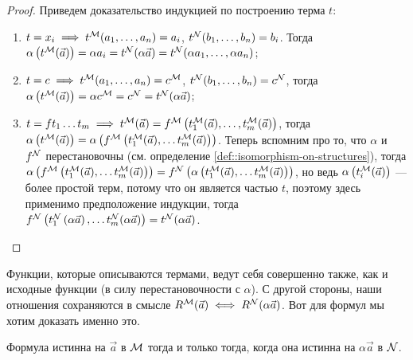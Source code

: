 \begin{proof}
    Приведем доказательство индукцией по построению терма $t$:
    \begin{enumerate}
        \item $t = x_{i} \implies t^{\mathcal{M}}(a_{1}, \ldots, a_{n}) = a_{i}$, $t^{\mathcal{N}}(b_{1}, \ldots, b_{n}) = b_{i}$.
        Тогда $\alpha\left(t^{\mathcal{M}}(\vec{a})\right) = \alpha a_{i} = t^{\mathcal{N}}(\alpha \vec{a}) = t^{\mathcal{N}}(\alpha a_{1}, \ldots, \alpha a_{n})$;
        \item $t = c \implies t^{\mathcal{M}}(a_{1}, \ldots, a_{n}) = c^{\mathcal{M}}$, $t^{\mathcal{N}}(b_{1}, \ldots, b_{n}) = c^{\mathcal{N}}$, тогда $\alpha\left(t^{\mathcal{M}}(\vec{a})\right) = \alpha c^{\mathcal{M}} = c^{\mathcal{N}} = t^{\mathcal{N}}(\alpha \vec{a})$;
        \item $t = f t_{1} \ldots t_{m} \implies t^{\mathcal{M}}(\vec{a}) = f^{\mathcal{M}}\left(t_{1}^{\mathcal{M}}(\vec{a}), \ldots, t_{m}^{\mathcal{M}}(\vec{a})\right)$, тогда $\alpha\left(t^{\mathcal{M}}(\vec{a})\right) = \alpha\left(f^{\mathcal{M}}\left(t_{1}^{\mathcal{M}}(\vec{a}), \ldots t_{m}^{\mathcal{M}}(\vec{a})\right)\right)$.
        Теперь вспомним про то, что $\alpha$ и $f^{\mathcal{N}}$ перестановочны (см. определение \ref{def::isomorphism-on-structures}), тогда $\alpha\left(f^{\mathcal{M}}\left(t_{1}^{\mathcal{M}}(\vec{a}), \ldots t_{m}^{\mathcal{M}}(\vec{a})\right)\right) = f^{\mathcal{N}}\left(\alpha\left(t_{1}^{\mathcal{M}}(\vec{a}), \ldots t_{m}^{\mathcal{M}}(\vec{a})\right)\right)$, но ведь $\alpha\left(t_{i}^{\mathcal{M}}(\vec{a})\right)$ --- более простой терм, потому что он является частью $t$, поэтому здесь применимо предположение индукции, тогда $f^{\mathcal{N}}\left(t_{1}^{\mathcal{N}}\left(\alpha\vec{a}\right), \ldots t_{m}^{\mathcal{N}}(\alpha\vec{a})\right) = t^{\mathcal{N}}(\alpha \vec{a})$. \qedhere
    \end{enumerate}
\end{proof}

Функции, которые описываются термами, ведут себя совершенно также, как и исходные функции (в силу перестановочности с $\alpha$).
С другой стороны, наши отношения сохраняются в смысле $R^{\mathcal{M}}(\vec{a}) \iff R^{\mathcal{N}}(\alpha \vec{a})$.
Вот для формул мы хотим доказать именно это.

\begin{theorem}
    Формула истинна на $\vec{a}$ в $\mathcal{M}$ тогда и только тогда, когда она истинна на $\alpha \vec{a}$ в $\mathcal{N}$.
\end{theorem}

